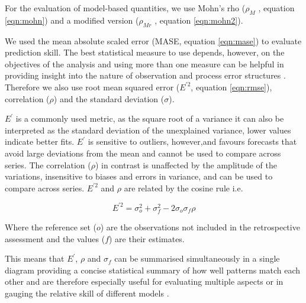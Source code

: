 For the evaluation of model-based quantities, we use Mohn's rho ($\rho_M$ , equation \ref{eqn:mohn}) and a modified version ($\rho_{Mr}$ , equation \ref{eqn:mohn2}). 

We used the mean absolute scaled error (MASE, equation \ref{eqn:mase}) to evaluate prediction skill. The best statistical measure to use depends, however, on the objectives of the analysis and using more than one measure can be helpful in providing insight into the nature of observation and process error structures \parencite{kell2016xval}. Therefore we also use root mean squared error ($E^{\prime 2}$, equation \ref{eqn:rmse}), correlation ($\rho$) and the standard deviation ($\sigma$). 

$E^\prime$ is a commonly used metric, as the square root of a variance it can also be interpreted as the standard deviation of the unexplained variance,  lower values indicate better fits. $E^\prime$ is sensitive to outliers, however,and favours forecasts that avoid large deviations from the mean and cannot be used to compare across series. The correlation ($\rho$) in contrast is unaffected by the amplitude of the variations, insensitive to biases and errors in variance, and can be used to compare across series. $E^{\prime 2}$ and $\rho$ are related by the cosine rule i.e.

 \begin{equation} 
 E^{\prime 2} = \sigma_o^2 + \sigma_f^2 - 2\sigma_o\sigma_f\rho
 \end{equation}

Where the reference set ($o$) are the observations not included in the retrospective assessment and the values ($f$) are their estimates. 
 
This means that $E^\prime$, $\rho$ and $\sigma_f$ can be summarised simultaneously in a single diagram\parencite{taylor2001summarizing} providing a concise statistical summary of how well patterns match each other and are therefore especially useful for evaluating multiple aspects or in gauging the relative skill of different models \parencite{griggs2002climate}.

